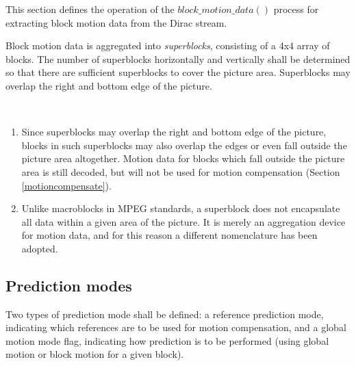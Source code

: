 
\label{motiondec}

This section defines the operation of the $block\_motion\_data()$ process for extracting
block motion data from the Dirac stream. 

Block motion data is aggregated into {\em superblocks}, consisting of a 4x4 array of 
blocks. The number of superblocks horizontally and vertically shall be determined so 
that there are sufficient superblocks to cover the picture area. Superblocks 
may overlap the right and bottom edge of the picture.

\begin{informative}
\\
\begin{enumerate}
\item Since superblocks may overlap the right and bottom edge of the picture, blocks in 
such superblocks may also overlap the edges or even fall outside the picture area
 altogether. Motion data for blocks which fall outside the picture area is still decoded, but
 will not be used for motion compensation (Section \ref{motioncompensate}). 

\item Unlike macroblocks in MPEG standards, a superblock does not encapsulate all 
data within a given area of the picture. It is merely an aggregation device for motion data,
and for this reason a different nomenclature has been adopted.
\end{enumerate}
\end{informative}

\subsection{Prediction modes}

Two types of prediction mode shall be defined: a reference prediction mode, indicating
which references are to be used for motion compensation,  and a global motion
 mode flag, indicating how prediction is to be performed (using global motion or block
 motion for a given block).


